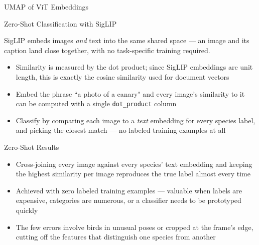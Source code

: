 \documentclass[8pt,aspectratio=169]{beamer}
\begin{document}
\begin{rightframe}{UMAP of ViT Embeddings}
\end{rightframe}

\begin{textframe}{Zero-Shot Classification with SigLIP}

SigLIP embeds images \textit{and} text into the same shared space --- an image and its caption land close together, with no task-specific training required.

\begin{itemize}
\item Similarity is measured by the dot product; since SigLIP embeddings are unit length, this is exactly the cosine similarity used for document vectors
\item Embed the phrase ``a photo of a canary" and every image's similarity to it can be computed with a single \texttt{dot\_product} column
\item Classify by comparing each image to a \textit{text} embedding for every species label, and picking the closest match --- no labeled training examples at all
\end{itemize}

\end{textframe}

\begin{textframe}{Zero-Shot Results}

\begin{itemize}
\item Cross-joining every image against every species' text embedding and keeping the highest similarity per image reproduces the true label almost every time
\item Achieved with zero labeled training examples --- valuable when labels are expensive, categories are numerous, or a classifier needs to be prototyped quickly
\item The few errors involve birds in unusual poses or cropped at the frame's edge, cutting off the features that distinguish one species from another
\end{itemize}

\end{textframe}
\end{document}
